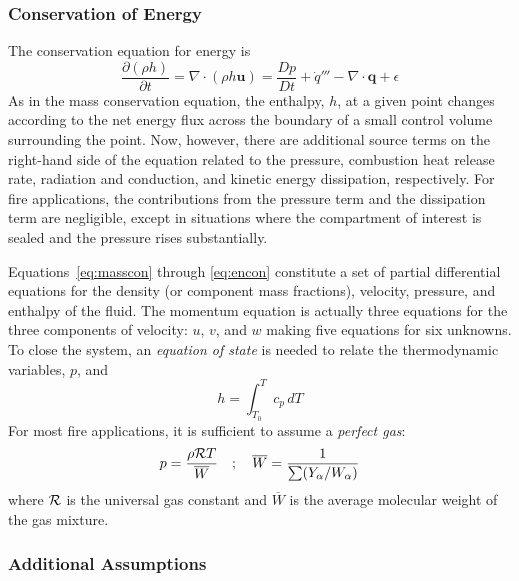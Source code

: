 \documentclass[graybox]{svmult}
\begin{document}
\subsubsection{Conservation of Energy}

The conservation equation for energy is
\begin{equation}
\frac{\partial (\rho h)}{\partial t} = \nabla \cdot (\rho h \mathbf{u}) = \frac{Dp}{Dt} + \dot{q}''' - \nabla \cdot \mathbf{q} + \epsilon
\label{eq:encon}
\end{equation}
As in the mass conservation equation, the enthalpy, $h$, at a given point changes according to the net energy flux across the boundary of a small control volume surrounding the point. Now, however, there are additional source terms on the right-hand side of the equation related to the pressure, combustion heat release rate, radiation and conduction, and kinetic energy dissipation, respectively. For fire applications, the contributions from the pressure term and the dissipation term are negligible, except in situations where the compartment of interest is sealed and the pressure rises substantially.

Equations~\ref{eq:masscon} through \ref{eq:encon} constitute a set of partial differential equations for the density (or component mass fractions), velocity, pressure, and enthalpy of the fluid. The momentum equation is actually three equations for the three components of velocity: $u$, $v$, and $w$ making five equations for six unknowns. To close the system, an {\em equation of state} is needed to relate the thermodynamic variables, $p$, and
\begin{equation}
h = \int_{T_0}^T c_p \, dT
\label{eq:hdef}
\end{equation}
For most fire applications, it is sufficient to assume a {\em perfect gas}:
\begin{equation}
p = \frac{\rho {\cal R} T}{\overline{W}} \quad ; \quad \overline{W} = \frac{1}{\sum (Y_\alpha / W_\alpha)}
\label{eq:pgas}
\end{equation}
where ${\cal R}$ is the universal gas constant and $\overline{W}$ is the average molecular weight of the gas mixture.


\subsubsection{Additional Assumptions}
\end{document}
